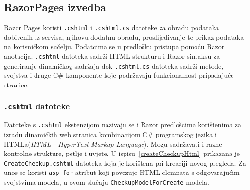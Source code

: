 \subsection{RazorPages izvedba}
\label{subsec:izvedbaRP}

Razor Pages koristi \texttt{.cshtml} i \texttt{.cshtml.cs} datoteke za obradu podataka dobivenih iz servisa, njihovu dodatnu obradu, proslijeđivanje te prikaz podataka na korisničkom sučelju. Podatcima se u predlošku pristupa pomoću Razor anotacija. \texttt{.cshtml} datoteka sadrži HTML strukturu i Razor sintaksu za generiranje dinamičkog sadržaja dok \texttt{.cshtml.cs} datoteka sadrži metode, svojstva i druge C\# komponente koje podržavaju funkcionalnost pripadajuće stranice.
\subsubsection{\texttt{.cshtml} datoteke}
\label{subsubsec:.cshtml}
Datoteke s \texttt{.cshtml} ekstenzijom nazivaju se i Razor predlošcima korištenima za izradu dinamičkih web stranica kombinacijom C\# programskog jezika i HTMLa(\textit{HTML - HyperText Markup Language}). Mogu sadržavati i razne kontrolne strukture, petlje i uvjete. U ispisu~\ref{createCheckupHtml} prikazana je \texttt{CreateCheckup.cshtml} datoteka koja je korištena pri kreaciji novog pregleda. Za unos se koristi \texttt{asp-for} atribut koji povezuje HTML elemnata s odgovarajućim svojstvima modela, u ovom slučaju \texttt{CheckupModelForCreate} modela.

